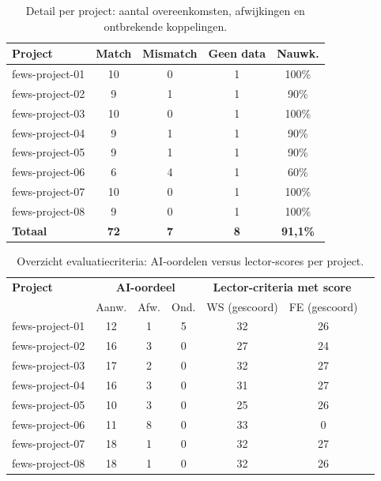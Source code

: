 \documentclass[dutch,dit,thesis]{hogentreport}
\begin{document}
\clearpage

\begin{table}[htbp]
    \centering
    \caption[Ontvankelijkheid per project]{Detail per project: aantal overeenkomsten, afwijkingen en ontbrekende koppelingen.}
    \label{tab:ontv-per-project}
    \begin{tabular}{l c c c c}
        \hline
        \textbf{Project} & \textbf{Match} & \textbf{Mismatch} & \textbf{Geen data} & \textbf{Nauwk.} \\
        \hline
        fews-project-01 & 10 & 0 & 1 & 100\% \\
        fews-project-02 & 9  & 1 & 1 & 90\% \\
        fews-project-03 & 10 & 0 & 1 & 100\% \\
        fews-project-04 & 9  & 1 & 1 & 90\% \\
        fews-project-05 & 9  & 1 & 1 & 90\% \\
        fews-project-06 & 6  & 4 & 1 & 60\% \\
        fews-project-07 & 10 & 0 & 1 & 100\% \\
        fews-project-08 & 9  & 0 & 1 & 100\% \\
        \hline
        \textbf{Totaal} & \textbf{72} & \textbf{7} & \textbf{8} & \textbf{91,1\%} \\
        \hline
    \end{tabular}
\end{table}

\begin{table}[htbp]
    \centering
    \caption[Evaluatiecriteria overzicht]{Overzicht evaluatiecriteria: AI-oordelen versus lector-scores per project.}
    \label{tab:eval-overview}
    \small
    \begin{tabular}{l c c c c c c}
        \hline
        \textbf{Project} & \multicolumn{3}{c}{\textbf{AI-oordeel}} & \multicolumn{2}{c}{\textbf{Lector-criteria met score}} \\
        & Aanw. & Afw. & Ond. & WS (gescoord) & FE (gescoord) \\
        \hline
        fews-project-01 & 12 & 1 & 5 & 32 & 26 \\
        fews-project-02 & 16 & 3 & 0 & 27 & 24 \\
        fews-project-03 & 17 & 2 & 0 & 32 & 27 \\
        fews-project-04 & 16 & 3 & 0 & 31 & 27 \\
        fews-project-05 & 10 & 3 & 0 & 25 & 26 \\
        fews-project-06 & 11 & 8 & 0 & 33 & 0 \\
        fews-project-07 & 18 & 1 & 0 & 32 & 27 \\
        fews-project-08 & 18 & 1 & 0 & 32 & 26 \\
        \hline
    \end{tabular}
\end{table}
\end{document}
